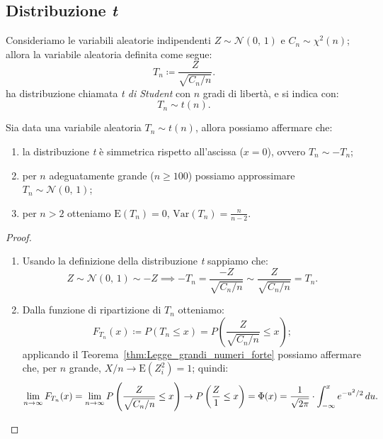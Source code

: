         \subsection{Distribuzione \emph{t}}
            \begin{defn}
                Consideriamo le variabili aleatorie indipendenti $Z \sim \mathcal{N}(0,\,1)$ e $C_n \sim \chi^2(n)$; allora la variabile aleatoria definita come segue:
                \begin{equation}\label{eq:Distribuzione_t}
                    T_n \coloneqq \frac{Z}{\sqrt{C_n /n}}
                .\end{equation}
                ha distribuzione chiamata \emph{t di Student} con $n$ gradi di libertà, e si indica con: \[
                    T_n \sim t(n)
            .\]
            \end{defn}
            \begin{prty}\label{prty:Distribuzione_t}
                Sia data una variabile aleatoria $T_n \sim t(n)$, allora possiamo affermare che:
                \begin{enumerate}
                    \item la distribuzione \emph{t} è simmetrica rispetto all'ascissa ($x=0$), ovvero $T_n \sim -T_n$;
                    \item per $n$ adeguatamente grande ($n \geq 100$) possiamo approssimare $T_n \sim \mathcal{N}(0,\,1)$;
                    \item per $n>2$ otteniamo $\text{E}(T_n)=0,\, \text{Var}(T_n)=\frac{n}{n-2}$.
                \end{enumerate}
            \end{prty}
            \begin{proof}
                \hfill
                \begin{enumerate}
                    \item Usando la definizione della distribuzione \emph{t} sappiamo che: \[
                        Z \sim \mathcal{N}(0,\,1) \sim -Z \implies
                        -T_n = \frac{-Z}{\sqrt{C_n /n}} \sim \frac{Z}{\sqrt{C_n /n}} = T_n
                    .\] 
                    \item Dalla funzione di ripartizione di $T_n$ otteniamo: \[
                            F_{T_n}(x) \coloneqq P(T_n \leq x) = P\left(\frac{Z}{\sqrt{C_n /n}} \leq x\right)
                        ;\] applicando il Teorema~\ref{thm:Legge_grandi_numeri_forte} possiamo affermare che, per $n$ grande, $X /n \rightarrow \text{E}(Z_i^2)=1$; quindi: \[
                        \lim_{n \to \infty} F_{T_n}(x) = 
                        \lim_{n \to \infty} P\left(\frac{Z}{\sqrt{C_n /n}} \leq x\right) \rightarrow
                        P\left(\frac{Z}{1} \leq x\right) = \Phi(x) = \frac{1}{\sqrt{2\pi}} \cdot \int_{-\infty}^{x} e^{-u^2 /2}\, du
                        .\qedhere\]
                \end{enumerate}
            \end{proof}

